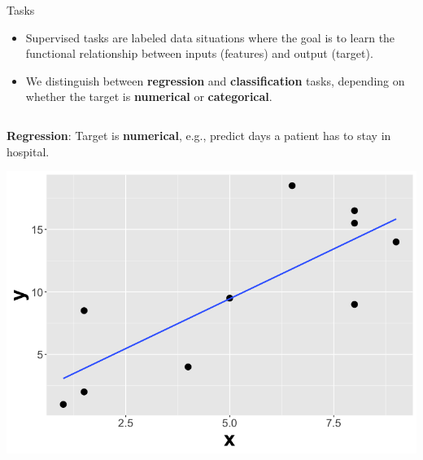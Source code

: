 \documentclass[11pt,compress,t,notes=noshow, xcolor=table]{beamer}
\begin{document}
 



\begin{vbframe}{Tasks}
\begin{itemize}
    \item Supervised tasks are labeled data situations where the goal is to learn the functional
        relationship between inputs (features) and output (target).
    
    \item We distinguish between \textbf{regression} and \textbf{classification} tasks, depending on whether the 
        target is \textbf{numerical} or \textbf{categorical}. 
\end{itemize}  

\lz

\begin{columns}    
\begin{column}{0.4\textwidth} 
\small \textbf{Regression}: Target is \textbf{numerical}, e.g., predict days a patient has to stay in hospital.

  \begin{center}
    \includegraphics[width=\textwidth]{slides/ml-basics/figure/nutshell-ml-basics-supervised-regression-task.png} 
  \end{center}
\end{column}    


\end{columns}
\end{vbframe}
\end{document}
